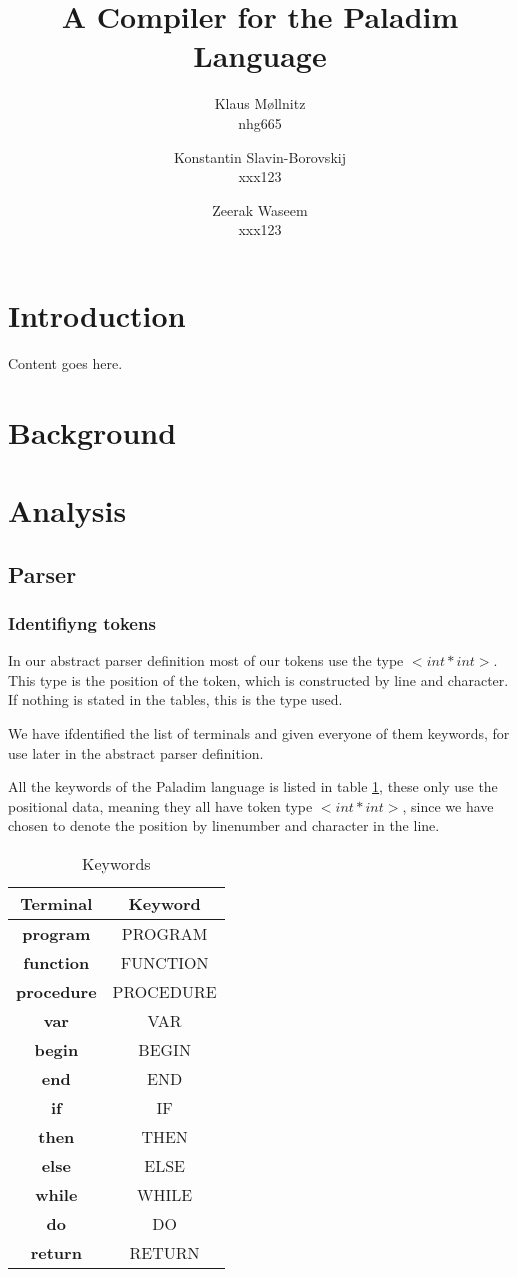\documentclass[10pt]{article}
\title{A Compiler for the \textbf{Paladim} Language}
\author{
    Klaus Møllnitz\\
    nhg665
  \and
    Konstantin Slavin-Borovskij\\
    xxx123 %
  \and
    Zeerak Waseem\\
    xxx123 %
}
\begin{document}
\maketitle

\section{Introduction}
Content goes here.

\section{Background}

\section{Analysis}
\subsection{Parser}
\subsubsection{Identifiyng tokens}
In our abstract parser definition most of our tokens use the type $<int*int>$. This type is the position of the token, which is constructed by line and character. If nothing is stated in the tables, this is the type used.

We have ifdentified the list of terminals and given everyone of them keywords, for use later in the abstract parser definition.

All the keywords of the Paladim language is listed in table \ref{tab:keywords}, these only use the positional data, meaning they all have token type $<int*int>$, since we have chosen to denote the position by linenumber and character in the line.

\begin{table}[h!]
\centering
\begin{tabular}{c|c}
Terminal & Keyword \\
\hline
\textbf{program} & PROGRAM \\
\textbf{function} & FUNCTION \\
\textbf{procedure} & PROCEDURE \\
\textbf{var} & VAR \\
\textbf{begin} & BEGIN \\
\textbf{end} & END \\
\textbf{if} & IF \\
\textbf{then} & THEN \\
\textbf{else} & ELSE \\
\textbf{while} & WHILE \\
\textbf{do} & DO \\
\textbf{return} & RETURN \\
\end{tabular}
\caption{\label{tab:keywords}Keywords}
\end{table}
\end{document}
